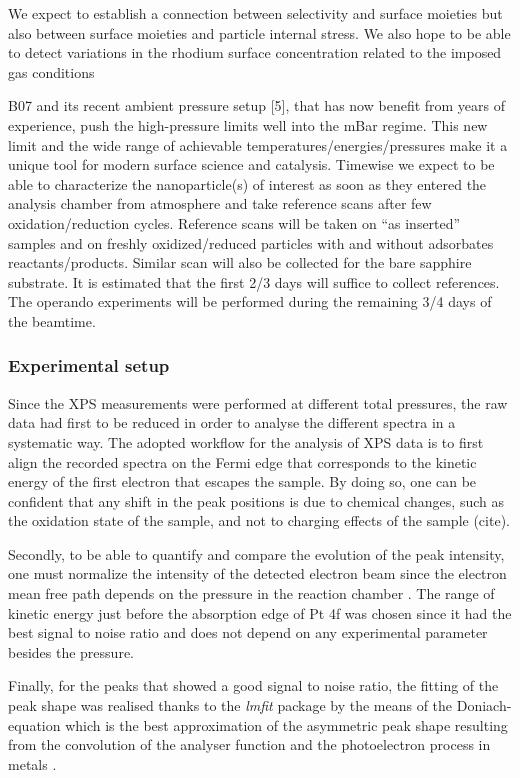We expect to establish a connection between selectivity and surface moieties but also between surface moieties and particle internal stress. We also hope to be able to detect variations in the rhodium surface concentration related to the imposed gas conditions

B07 and its recent ambient pressure setup [5], that has now benefit from years of experience, push the high-pressure limits well into the mBar regime.
This new limit and the wide range of achievable temperatures/energies/pressures make it a unique tool for modern surface science and catalysis.
Timewise we expect to be able to characterize the nanoparticle(s) of interest as soon as they entered the analysis chamber from atmosphere and take reference scans after few oxidation/reduction cycles.
Reference scans will be taken on “as inserted” samples and on freshly oxidized/reduced particles with and without adsorbates reactants/products.
Similar scan will also be collected for the bare sapphire substrate. It is estimated that the first 2/3 days will suffice to collect references.
The operando experiments will be performed during the remaining 3/4 days of the beamtime.

\subsubsection{Experimental setup}

Since the XPS measurements were performed at different total pressures, the raw data had first to be reduced in order to analyse the different spectra in a systematic way.
The adopted workflow for the analysis of XPS data is to first align the recorded spectra on the Fermi edge that corresponds to the kinetic energy of the first electron that escapes the sample.
By doing so, one can be confident that any shift in the peak positions is due to chemical changes, such as the oxidation state of the sample, and not to charging effects of the sample (cite).

Secondly, to be able to quantify and compare the evolution of the peak intensity, one must normalize the intensity of the detected electron beam since the electron mean free path depends on the pressure in the reaction chamber \parencite{Willmott}.
The range of kinetic energy just before the absorption edge of Pt 4f was chosen since it had the best signal to noise ratio and does not depend on any experimental parameter besides the pressure.

Finally, for the peaks that showed a good signal to noise ratio, the fitting of the peak shape was realised thanks to the \textit{lmfit} \parencite{Newville2016} package by the means of the Doniach-equation which is the best approximation of the asymmetric peak shape resulting from the convolution of the analyser function and the photoelectron process in metals \parencite{Doniach_1970}.

